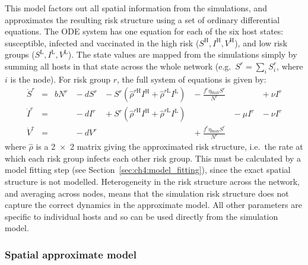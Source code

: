 This model factors out all spatial information from the simulations, and approximates the resulting risk structure using a set of ordinary differential equations. The ODE system has one equation for each of the six host states: susceptible, infected and vaccinated in the high risk ($S^\mathrm{H}, I^\mathrm{H}, V^\mathrm{H}$), and low risk groups ($S^\mathrm{L}, I^\mathrm{L}, V^\mathrm{L}$). The state values are mapped from the simulations simply by summing all hosts in that state across the whole network (e.g.\ $S^r = \sum_{i}S^r_i$, where $i$ is the node). For risk group $r$, the full system of equations is given by:
\begin{subequations}\label{eqn:ch4:risk_model}
\begin{alignat}{7}
    \dot{S}^r &={} &bN^r &{}-{} dS^r &{}-{} S^r\left(\hat{\rho}^{r\mathrm{H}}I^{\mathrm{H}} + \hat{\rho}^{r\mathrm{L}}I^{\mathrm{L}}\right) &{}-{} \frac{f^r\eta{}_\mathrm{max}S^r}{N^r} &&{}+{} \nu{}I^r \\
    \dot{I}^r &={}  &&{}-{} dI^r &{}+{} S^r\left(\hat{\rho}^{r\mathrm{H}}I^{\mathrm{H}} + \hat{\rho}^{r\mathrm{L}}I^{\mathrm{L}}\right)& &{}-{} \mu{}I^r &{}-{} \nu{}I^r \\
    \dot{V}^r &={}  &&{}-{} dV^r &&{}+{} \frac{f^r\eta{}_\mathrm{max}S^r}{N^r}&&
\end{alignat}
\end{subequations}
where $\hat{\rho}$ is a \num{2x2} matrix giving the approximated risk structure, i.e.\ the rate at which each risk group infects each other risk group. This must be calculated by a model fitting step (see Section~\ref{sec:ch4:model_fitting}), since the exact spatial structure is not modelled. Heterogeneity in the risk structure across the network, and averaging across nodes, means that the simulation risk structure does not capture the correct dynamics in the approximate model. All other parameters are specific to individual hosts and so can be used directly from the simulation model.

\subsubsection*{Spatial approximate model}

